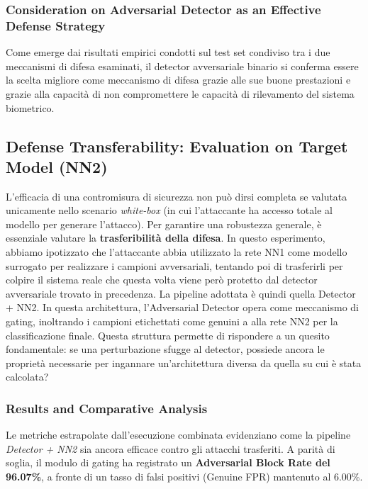 \documentclass[a4paper, 12pt]{article}
\begin{document}
\vspace{10pt}

\subsubsection{Consideration on Adversarial Detector as an Effective Defense Strategy}
Come emerge dai risultati empirici condotti sul test set condiviso tra i due meccanismi di difesa esaminati,
il detector avversariale binario si conferma essere la scelta migliore come meccanismo di difesa grazie 
alle sue buone prestazioni e grazie alla capacità di non compromettere le capacità di rilevamento del 
sistema biometrico.


\vspace{15pt}

\subsection{Defense Transferability: Evaluation on Target Model (NN2)}

L'efficacia di una contromisura di sicurezza non può dirsi completa se valutata unicamente 
nello scenario \textit{white-box} (in cui l'attaccante ha accesso totale al modello per 
generare l'attacco). Per garantire una robustezza generale, è essenziale valutare la 
\textbf{trasferibilità della difesa}. In questo esperimento, abbiamo ipotizzato che 
l'attaccante abbia utilizzato la rete NN1 come modello surrogato per realizzare i campioni 
avversariali, tentando poi di trasferirli per colpire il sistema reale che questa volta viene però 
protetto dal detector avversariale trovato in precedenza.
La pipeline adottata è quindi quella Detector + NN2. 
In questa architettura, l'Adversarial Detector opera come meccanismo di gating, inoltrando i campioni etichettati come genuini  
a alla rete NN2 per la classificazione 
finale. Questa struttura permette di rispondere a un quesito fondamentale: se una 
perturbazione sfugge al detector, possiede ancora le proprietà
necessarie per ingannare un'architettura diversa da quella su cui è stata calcolata?

\subsubsection{Results and Comparative Analysis}
Le metriche estrapolate dall'esecuzione combinata evidenziano come la pipeline 
\textit{Detector + NN2} sia ancora efficace contro gli attacchi trasferiti. 
A parità di soglia, il modulo di gating 
ha registrato un \textbf{Adversarial Block Rate del 96.07\%}, a fronte di un tasso di falsi 
positivi (Genuine FPR) mantenuto al 6.00\%.
\end{document}
